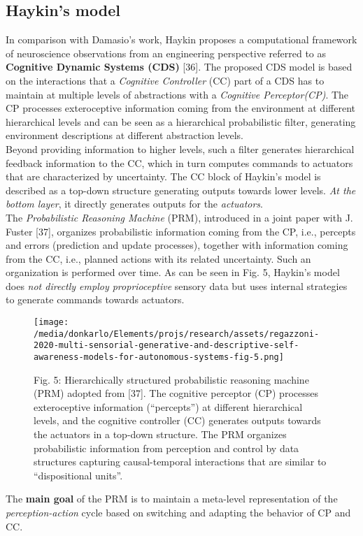 \documentclass{article}
\begin{document}
		\subsection{Haykin’s model}
		In comparison with Damasio’s work, Haykin proposes a computational framework of neuroscience observations from an engineering perspective referred to as \textbf{Cognitive Dynamic
		Systems (CDS)} [36]. The proposed CDS model is based on the interactions that a \emph{Cognitive Controller} (CC) part of a CDS has to maintain at multiple levels of abstractions with a \emph{Cognitive Perceptor(CP)}.  The CP processes exteroceptive information coming from the environment at different hierarchical levels and can be seen as a hierarchical probabilistic filter, generating environment descriptions at different abstraction levels.
		\\
		Beyond providing information to higher levels, such a filter generates hierarchical feedback information to the CC, which in turn computes commands to actuators that are characterized
		by uncertainty. The CC block of Haykin’s model is described as a top-down structure generating outputs towards lower levels. \emph{At the bottom layer}, it directly generates outputs for
		the \emph{actuators}.
		\\
		The \emph{Probabilistic Reasoning Machine} (PRM), introduced in a joint paper with J. Fuster [37], organizes probabilistic information coming from the CP, i.e., percepts and errors (prediction and update processes), together with information coming from the CC, i.e., planned actions with its related
		uncertainty. Such an organization is performed over time. As can be seen in Fig. 5, Haykin’s model does \emph{not directly employ proprioceptive} sensory data but uses internal strategies
		to generate commands towards actuators.
		\begin{figure*}
			\centering
			\texttt{[image: /media/donkarlo/Elements/projs/research/assets/regazzoni-2020-multi-sensorial-generative-and-descriptive-self-awareness-models-for-autonomous-systems-fig-5.png]}
			\caption{Fig. 5: Hierarchically structured probabilistic reasoning machine (PRM) adopted from [37]. The cognitive perceptor (CP) processes exteroceptive information (“percepts”) at different hierarchical levels, and the cognitive controller (CC) generates outputs towards the actuators in a top-down structure. The PRM organizes probabilistic information from perception and control by data structures capturing causal-temporal interactions that are similar to “dispositional units”.
			}
			\label{fig:regazzoni-2020-multi-sensorial-generative-and-descriptive-self-awareness-models-for-autonomous-systems-fig-5.png}
		\end{figure*}
		The \textbf{main goal} of the PRM is to maintain a meta-level representation of the \emph{perception-action} cycle based on switching and adapting the behavior of CP and CC.
		
\end{document}
